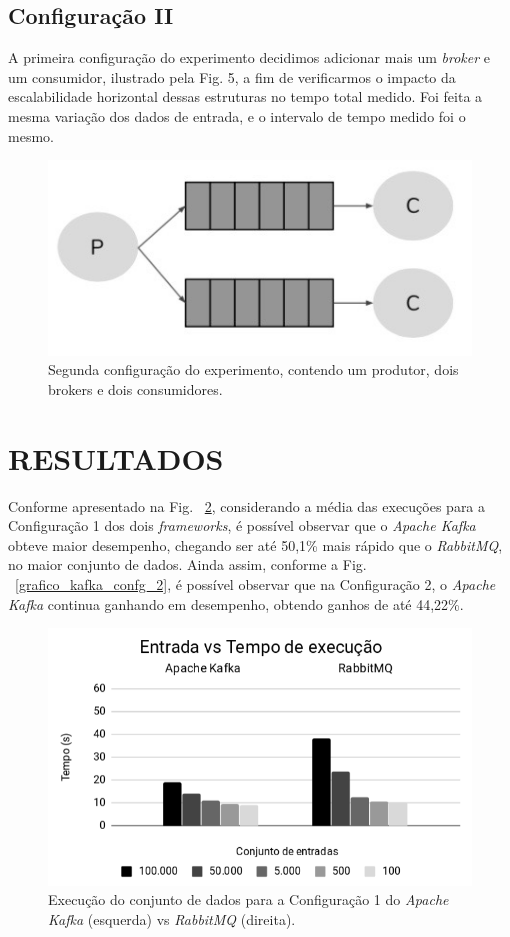 \documentclass[letterpaper, 10 pt, conference]{ieeeconf}  %
\begin{document}
\subsection{Configuração II}

A primeira configuração do experimento decidimos adicionar mais um \textit{broker} e um consumidor, ilustrado pela Fig. 5, a fim de verificarmos o impacto da escalabilidade horizontal dessas estruturas no tempo total medido. Foi feita a mesma variação dos dados de entrada, e o intervalo de tempo medido foi o mesmo. 

\begin{figure}[ht]
\centering
\includegraphics[width=.4\textwidth]{two-queues.jpeg}
\caption{Segunda configuração do experimento, contendo um produtor, dois brokers e dois consumidores.}
\label{fig:twoqueues}
\end{figure}

\section{RESULTADOS}

Conforme apresentado na Fig. ~\ref{grafico_kafka_confg_1}, considerando a média das execuções para a Configuração 1 dos dois \textit{frameworks}, é possível observar que o \textit{Apache Kafka} obteve maior desempenho, chegando ser até 50,1\% mais rápido que o \textit{RabbitMQ}, no maior conjunto de dados. Ainda assim, conforme a Fig. ~\ref{grafico_kafka_confg_2}, é possível observar que na Configuração 2, o \textit{Apache Kafka} continua ganhando em desempenho, obtendo ganhos de até 44,22\%. 

\begin{figure}[!htbp]
\centerline{\includegraphics[scale=0.4]{config1KafkavsRabbitMQ.png}}
\caption{Execução do conjunto de dados para a Configuração 1 do \textit{Apache Kafka} (esquerda) vs \textit{RabbitMQ} (direita).}
\label{grafico_kafka_confg_1}
\end{figure}
\end{document}
